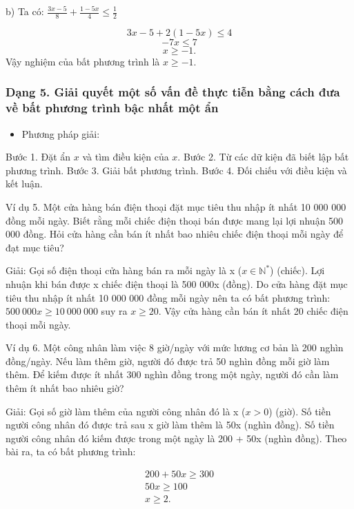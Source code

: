 \documentclass[%
    fontsize=12pt,%
    chapterprefix=false,%
    open=right,%
    twoside=false,%
    numbers=noenddot,%
    headings=optiontohead,%
    final,%
    DIV=15,%
    parskip=half %
]{scrbook}
\begin{document}
b) Ta có: $\frac{3x - 5}{8} + \frac{1 - 5x}{4} \leq \frac{1}{2}$

    \[
    3x - 5 + 2(1 - 5x) \leq 4
    \]
    \[
    -7x \leq 7
    \]
    \[
    x \geq -1.
    \]
Vậy nghiệm của bất phương trình là $x \geq -1$.
\subsubsection{Dạng 5. Giải quyết một số vấn đề thực tiễn bằng cách đưa về bất phương trình bậc nhất một ẩn}

\begin{itemize}
  \item Phương pháp giải:
\end{itemize}

    Bước 1. Đặt ẩn $x$ và tìm điều kiện của $x$.     Bước 2. Từ các dữ kiện đã biết lập bất phương trình.     Bước 3. Giải bất phương trình.     Bước 4. Đối chiếu với điều kiện và kết luận.

Ví dụ 5. Một cửa hàng bán điện thoại đặt mục tiêu thu nhập ít nhất 10 000 000 đồng mỗi ngày. Biết rằng mỗi chiếc điện thoại bán được mang lại lợi nhuận 500 000 đồng. Hỏi cửa hàng cần bán ít nhất bao nhiêu chiếc điện thoại mỗi ngày để đạt mục tiêu?


Giải: Gọi số điện thoại cửa hàng bán ra mỗi ngày là x ($x \in \mathbb{N}^*$) (chiếc). Lợi nhuận khi bán được x chiếc điện thoại là 500 000x (đồng). Do cửa hàng đặt mục tiêu thu nhập ít nhất 10 000 000 đồng mỗi ngày nên ta có bất phương trình: $500\ 000x \geq 10\ 000\ 000$ suy ra $x \geq 20$. Vậy cửa hàng cần bán ít nhất 20 chiếc điện thoại mỗi ngày.

Ví dụ 6. Một công nhân làm việc 8 giờ/ngày với mức lương cơ bản là 200 nghìn đồng/ngày. Nếu làm thêm giờ, người đó được trả 50 nghìn đồng mỗi giờ làm thêm. Để kiếm được ít nhất 300 nghìn đồng trong một ngày, người đó cần làm thêm ít nhất bao nhiêu giờ?

Giải: Gọi số giờ làm thêm của người công nhân đó là x ($x > 0$) (giờ). Số tiền người công nhân đó được trả sau x giờ làm thêm là 50x (nghìn đồng). Số tiền người công nhân đó kiếm được trong một ngày là 200 + 50x (nghìn đồng). Theo bài ra, ta có bất phương trình:

\begin{align*}
200 + 50x \geq 300 \\
50x \geq 100 \\
x \geq 2.
\end{align*}
\end{document}
